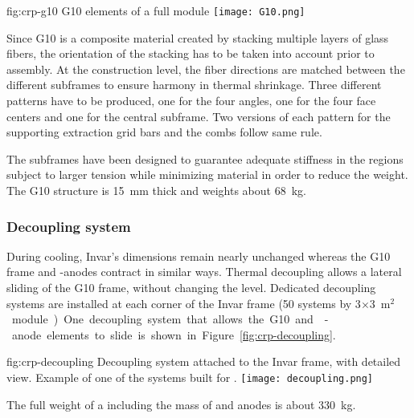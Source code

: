 \begin{dunefigure}{fig:crp-g10}
{G10 elements of a full  module}
\texttt{[image: G10.png]}
\end{dunefigure}

Since G10 is a composite material created by stacking multiple layers of glass fibers,  the orientation of the stacking has to be taken into account prior to assembly.
At the construction level, the fiber directions are matched between the different subframes to ensure harmony in thermal shrinkage. Three different patterns have to be produced, one for the four angles, one for the four face centers and one for the central subframe.
Two versions of each pattern for the supporting extraction grid bars and the combs follow same rule.

The subframes have been designed to guarantee %
adequate stiffness in the  regions subject to larger tension while minimizing material in order to reduce the weight.
The G10 structure is \SI{15}{mm} thick and weights about \SI{68}{kg}. 

\subsubsection{Decoupling system}
During cooling, Invar's dimensions remain nearly unchanged whereas the G10 frame and -anodes contract in similar ways. Thermal decoupling allows a lateral sliding of the G10 frame, without changing the level. 
Dedicated decoupling systems are installed at each corner of the Invar frame (\num{50} systems by  \num{3}$\times$\SI{3}{m$^{2}$} module). One decoupling system that allows the G10 and -anode elements to slide is shown in  Figure~\ref{fig:crp-decoupling}.

\begin{dunefigure}{fig:crp-decoupling}
{Decoupling system attached to the Invar frame, with detailed view. Example of one of the systems built for .}
\texttt{[image: decoupling.png]}
\end{dunefigure}

The full weight of a  including the mass of  and anodes is about \SI{330}{kg}.

